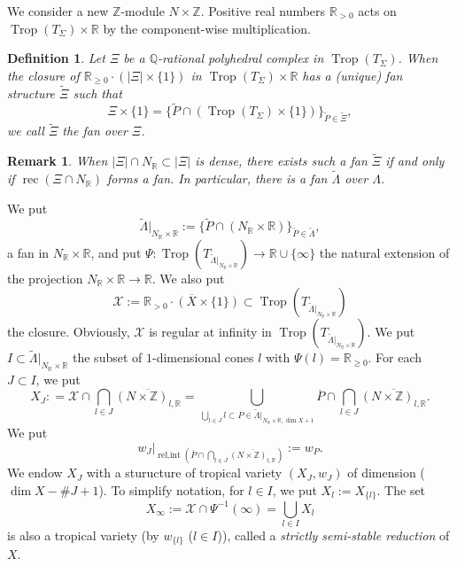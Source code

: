 \documentclass[12pt,a4]{amsart}
\newtheorem{dfn}[thm]{Definition}
\newtheorem{rem}[thm]{Remark}
\def\R{\mathbb{R}}
\def\Z{\mathbb{Z}}
\def\Q{\mathbb{Q}}
\def\X{\mathscr{X}}
\def\rec{\mathop{\mathrm{rec}}\nolimits}
\def\Trop{\mathop{\mathrm{trop}}\nolimits}
\def\relint{\mathop{\mathrm{rel.int}}\nolimits}
\def\Trop{\mathop{\mathrm{Trop}}\nolimits}
\numberwithin{equation}{section}
\numberwithin{figure}{section}
\begin{document}
   We consider a new $\Z$-module $N \times \Z$.
  Positive real numbers $\R_{>0}$ acts on $\Trop (T_{\Sigma}) \times \R$ by the component-wise multiplication. 

  \begin{dfn}\label{fans over polyhedral complex and quasi-projectivity:label}
   Let $\Xi $ be a $\Q$-rational polyhedral complex in $\Trop ( T_{\Sigma} )$.
    When  the closure of 
    $\R_{\geq 0} \cdot  
    ( \lvert \Xi \rvert \times \{1 \} )$
   in $\Trop ( T_{\Sigma} ) \times \R$
   has a (unique) fan structure $\tilde{\Xi}$
   such that 
   $$ \Xi  \times \{1 \} 
      = \{ \tilde{P} \cap (\Trop ( T_{\Sigma} ) \times \{ 1 \})
       \}_{\tilde{P} \in \tilde{\Xi}} ,
        $$
    we call $\tilde{\Xi}$ the fan over $\Xi$.
  \end{dfn}

  \begin{rem}
  When $\lvert \Xi \rvert \cap N_\R \subset \lvert \Xi \rvert $ is dense, 
   there exists such a fan $\tilde{\Xi}$
   if and only if 
   $\rec (\Xi \cap N_\R) $ forms a fan.
   In particular, there is a fan $\tilde{\Lambda}$ 
    over $\Lambda$.
  \end{rem}


  We put 
  $$\tilde{\Lambda} |_{ N_\R \times \R } 
     := \{ \tilde{P} \cap (N_\R \times \R) \}_{\tilde{P} \in \tilde{\Lambda}}, $$
     a fan in $N_\R \times \R$,
   and put 
   $\Psi \colon \Trop (T_{\tilde{\Lambda} |_{ N_\R \times \R }})\to \R \cup \{ \infty \} $
   the natural extension of the projection 
   $ N_\R \times \R \to \R$.
   We also put 
   $$ \X := \overline{ \R_{>0 } \cdot ( X\times \{ 1  \} )}
   \subset \Trop (T_{\tilde{\Lambda}|_{  N_\R \times \R } })   $$
   the closure.  Obviously, $\X $ is regular at infinity in 
   $\Trop (T_{\tilde{\Lambda}|_{  N_\R \times \R } })   $.
   We put $I 
     \subset \tilde{\Lambda} |_{ N_\R \times \R } 
     $ the subset of $1$-dimensional cones $l$ with $\Psi (l) = \R_{\geq 0}$.
     For each $J \subset I$, 
     we put 
     $$ X_J: = 
         \X \cap \bigcap_{ l \in J  }
           \overline{ ( N \times \Z )_{ l , \R } }
          =  
          \bigcup_{ \bigcup_{l \in J} l \subset P \in \tilde{ \Lambda }|_{ N_\R \times \R , \dim X +1}
           }
          \overline{P} \cap 
         \bigcap_{ l \in J  }
           \overline{ ( N \times \Z )_{ l , \R } }.
           $$
    We put
      $$w_J  |_{ \relint (
        \overline{P} \cap 
         \bigcap_{ l \in J  }
           \overline{ ( N \times \Z )_{ l , \R } }
                )  }
            := w_P. 
      $$
    We endow $X_J$ with a sturucture of tropical variety $(X_J, w_J)$ of dimension ($\dim X - \# J +1$).
    To simplify notation, for $l \in I$, 
      we put $X_l:= X_{ \{ l \} }$.
   The set 
   $$ X_{\infty} := \X \cap \Psi^{-1} (\infty) 
         = \bigcup_{ l \in I } X_l
         $$
    is also a tropical variety (by $w_{ \{ l \} }$ ($l \in I$)), 
    called a \emph{strictly semi-stable reduction} of $X$.
\end{document}
